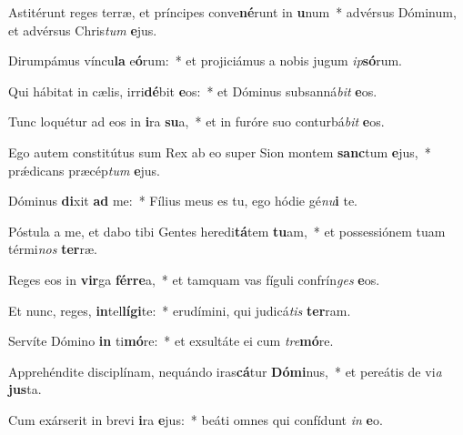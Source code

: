 \item Astitérunt reges terræ, et príncipes conve\textbf{né}runt in \textbf{u}num~* advérsus Dóminum, et advérsus Chris\textit{tum} \textbf{e}jus.
\item Dirumpámus víncu\textbf{la} e\textbf{ó}rum:~* et projiciámus a nobis jugum \textit{ip}\textbf{só}rum.
\item Qui hábitat in cælis, irri\textbf{dé}bit \textbf{e}os:~* et Dóminus subsanná\textit{bit} \textbf{e}os.
\item Tunc loquétur ad eos in \textbf{i}ra \textbf{su}a,~* et in furóre suo conturbá\textit{bit} \textbf{e}os.
\item Ego autem constitútus sum Rex ab eo super Sion montem \textbf{sanc}tum \textbf{e}jus,~* prǽdicans præcép\textit{tum} \textbf{e}jus.
\item Dóminus \textbf{di}xit \textbf{ad} me:~* Fílius meus es tu, ego hódie gé\textit{nu}\textbf{i} te.
\item Póstula a me, et dabo tibi Gentes heredi\textbf{tá}tem \textbf{tu}am,~* et possessiónem tuam térmi\textit{nos} \textbf{ter}ræ.
\item Reges eos in \textbf{vir}ga \textbf{fér}\textbf{re}a,~* et tamquam vas fíguli confrín\textit{ges} \textbf{e}os.
\item Et nunc, reges, \textbf{in}tel\textbf{lí}\textbf{gi}te:~* erudímini, qui judicá\textit{tis} \textbf{ter}ram.
\item Servíte Dómino \textbf{in} ti\textbf{mó}re:~* et exsultáte ei cum \textit{tre}\textbf{mó}re.
\item Apprehéndite disciplínam, nequándo iras\textbf{cá}tur \textbf{Dó}\textbf{mi}nus,~* et pereátis de vi\textit{a} \textbf{jus}ta.
\item Cum exárserit in brevi \textbf{i}ra \textbf{e}jus:~* beáti omnes qui confídunt \textit{in} \textbf{e}o.
